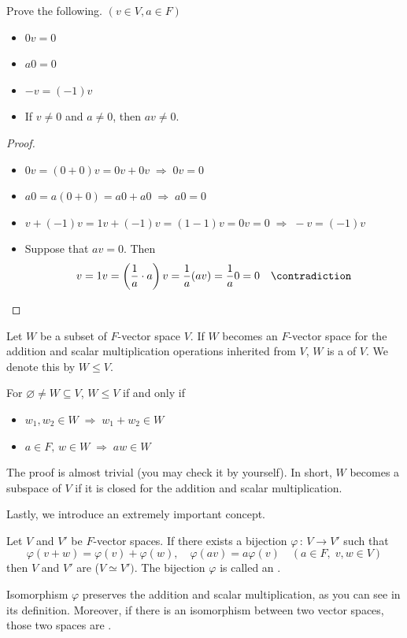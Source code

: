 \documentclass[a4paper, 10pt]{article}
\begin{document}
\begin{exer}
    Prove the following. $(v \in V, a \in F)$
    \begin{itemize}
        \item[(1)] $0v = 0$
        \item[(2)] $a0 = 0$
        \item[(3)] $-v = (-1)v$
        \item[(4)] If $v \neq 0$ and $a \neq 0$, then $av \neq 0$.
    \end{itemize}
\end{exer}
\begin{proof}
    \begin{itemize}
        \item[(1)] $0v = (0 + 0)v = 0v + 0v \;\Longrightarrow\; 0v = 0$
        \item[(2)] $a0 = a(0 + 0) = a0 + a0 \;\Longrightarrow\; a0 = 0$
        \item[(3)] $v + (-1)v = 1v + (-1)v = (1 - 1)v = 0v = 0 \;\Longrightarrow\; -v = (-1)v$
        \item[(4)] Suppose that $av = 0$. Then
        \[ v = 1v = \left(\frac{1}{a} \cdot a\right)v = \frac{1}{a}(av) = \frac{1}{a}0 = 0 \quad \contradiction \]
    \end{itemize}
\end{proof}
\begin{definition}[Subspaces]
    Let $W$ be a subset of $F$-vector space $V$. If $W$ becomes an $F$-vector space for the addition and scalar multiplication operations inherited from $V$, $W$ is a  of $V$. We denote this by $W \leq V$.
\end{definition}
\begin{obs}
    For $\varnothing \neq W \subseteq V$, $W \leq V$ if and only if
    \begin{itemize}
        \item[(1)] $w_{1}, w_{2} \in W \;\Longrightarrow\; w_{1} + w_{2} \in W$
        \item[(2)] $a \in F, \, w \in W \;\Longrightarrow\; aw \in W$
    \end{itemize}
\end{obs}
The proof is almost trivial (you may check it by yourself). In short, $W$ becomes a subspace of $V$ if it is closed for the addition and scalar multiplication.

\seprule

Lastly, we introduce an extremely important concept.
\begin{definition}[Isomorphisms]
    Let $V$ and $V'$ be $F$-vector spaces. If there exists a bijection $\varphi \,:\, V \rightarrow V'$ such that
    \[ \varphi(v + w) = \varphi(v) + \varphi(w), \quad \varphi(av) = a\varphi(v) \quad (a \in F, \; v, w \in V) \]
    then $V$ and $V'$ are  ($V \simeq V')$. The bijection $\varphi$ is called an .
\end{definition}
\begin{remark}
    Isomorphism $\varphi$ preserves the addition and scalar multiplication, as you can see in its definition. Moreover, if there is an isomorphism between two vector spaces, those two spaces are  .
\end{remark}
\newpage
\end{document}

